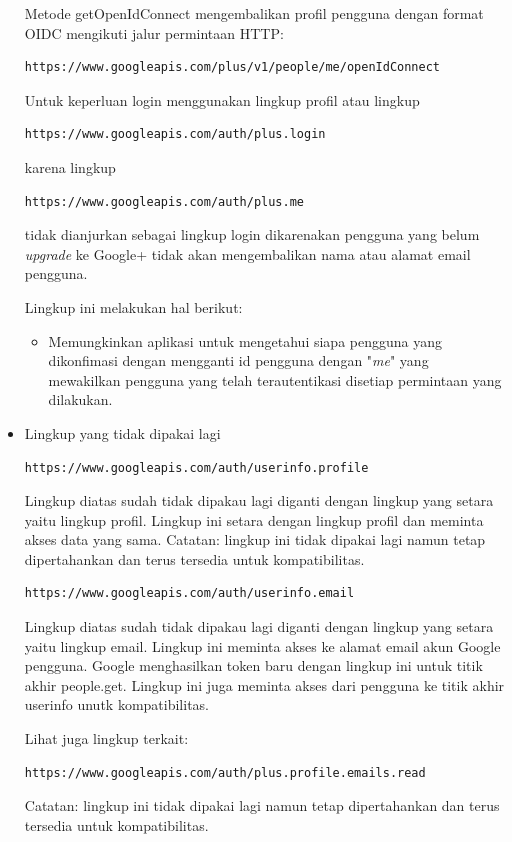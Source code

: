 \begin{itemize}
Metode getOpenIdConnect mengembalikan profil pengguna dengan format OIDC mengikuti jalur permintaan HTTP:
\begin{lstlisting}[basicstyle=\footnotesize]
https://www.googleapis.com/plus/v1/people/me/openIdConnect
\end{lstlisting}

Untuk keperluan login menggunakan lingkup profil atau lingkup
\begin{lstlisting}[basicstyle=\footnotesize]
https://www.googleapis.com/auth/plus.login
\end{lstlisting}
karena lingkup
\begin{lstlisting}[basicstyle=\footnotesize]
https://www.googleapis.com/auth/plus.me
\end{lstlisting}
tidak dianjurkan sebagai lingkup login dikarenakan pengguna yang belum {\it upgrade} ke Google+ tidak akan mengembalikan nama atau alamat email
pengguna.

Lingkup ini melakukan hal berikut:
\begin{itemize}
\item
Memungkinkan aplikasi untuk mengetahui siapa pengguna yang dikonfimasi dengan mengganti id pengguna dengan "{\it me}" yang mewakilkan pengguna yang telah terautentikasi disetiap permintaan yang dilakukan.
\end{itemize}

\item Lingkup yang tidak dipakai lagi\\
\begin{lstlisting}[basicstyle=\footnotesize]
https://www.googleapis.com/auth/userinfo.profile
\end{lstlisting}

Lingkup diatas sudah tidak dipakau lagi diganti dengan lingkup yang setara yaitu lingkup profil. Lingkup ini setara dengan lingkup profil dan meminta akses data yang sama. Catatan: lingkup ini tidak dipakai lagi namun tetap dipertahankan dan terus tersedia untuk kompatibilitas.

\begin{lstlisting}[basicstyle=\footnotesize]
https://www.googleapis.com/auth/userinfo.email
\end{lstlisting}

Lingkup diatas sudah tidak dipakau lagi diganti dengan lingkup yang setara yaitu lingkup email. Lingkup ini meminta akses ke alamat email akun Google pengguna. Google menghasilkan token baru dengan lingkup ini untuk titik akhir people.get. Lingkup ini juga meminta akses dari pengguna ke titik akhir userinfo unutk kompatibilitas.

Lihat juga lingkup terkait:
\begin{lstlisting}[basicstyle=\footnotesize]
https://www.googleapis.com/auth/plus.profile.emails.read
\end{lstlisting}
Catatan: lingkup ini tidak dipakai lagi namun tetap dipertahankan dan terus tersedia untuk kompatibilitas.
\end{itemize}

